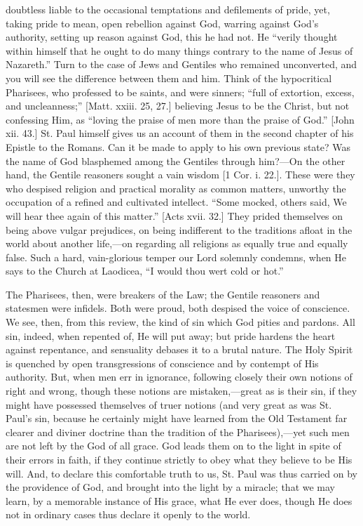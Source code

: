 doubtless liable to the occasional temptations and defilements of
pride, yet, taking pride to mean, open rebellion against God, warring
against God's authority, setting up reason against God, this he had
not. He ``verily thought within himself that he ought to do many
things contrary to the name of Jesus of Nazareth.'' Turn to the
case of Jews and Gentiles who remained unconverted, and you will see
the difference between them and him. Think of the hypocritical
Pharisees, who professed to be saints, and were sinners; ``full of
extortion, excess, and uncleanness;'' [Matt. xxiii. 25, 27.]
believing Jesus to be the Christ, but not confessing Him, as
``loving the praise of men more than the praise of God.''
[John xii. 43.] St. Paul himself gives us an account of them in the
second chapter of his Epistle to the Romans. Can it be made to apply
to his own previous state? Was the name of God blasphemed among the
Gentiles through him?—On the other hand, the Gentile reasoners
sought a vain wisdom [1 Cor. i. 22.]. These were they who despised
religion and practical morality as common matters, unworthy the
occupation of a refined and cultivated intellect. ``Some mocked,
others said, We will hear thee again of this matter.'' [Acts xvii.
32.] They prided themselves on being above vulgar prejudices, on being
indifferent to the traditions afloat in the world about another life,—on
regarding all religions as equally true and equally false. Such a
hard, vain-glorious temper our Lord solemnly condemns, when He says to
the Church at Laodicea, ``I would thou wert cold or hot.''

The Pharisees, then, were breakers of the Law; the Gentile
reasoners and statesmen were infidels. Both were proud, both despised
the voice of conscience. We see, then, from this review, the kind of
sin which God pities and pardons. All sin, indeed, when repented of,
He will put away; but pride hardens the heart against repentance, and
sensuality debases it to a brutal nature. The Holy Spirit is quenched
by open transgressions of conscience and by contempt of His authority.
But, when men err in ignorance, following closely their own notions of
right and wrong, though these notions are mistaken,—great as is
their sin, if they might have possessed themselves of truer notions
(and very great as was St. Paul's sin, because he certainly might have
learned from the Old Testament far clearer and diviner doctrine than
the tradition of the Pharisees),—yet such men are not left by the
God of all grace. God leads them on to the light in spite of their
errors in faith, if they continue strictly to obey what they believe
to be His will. And, to declare this comfortable truth to us, St. Paul
was thus carried on by the providence of God, and brought into the
light by a miracle; that we may learn, by a memorable instance of His
grace, what He ever does, though He does not in ordinary cases thus
declare it openly to the world.

